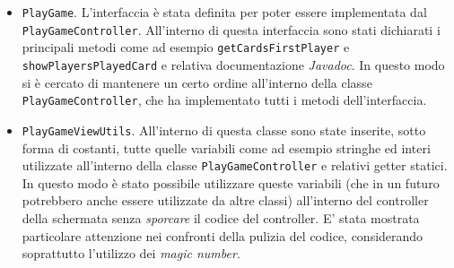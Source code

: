 	\begin{itemize}
	\item \texttt{PlayGame}.
	L'interfaccia è stata definita per poter essere implementata dal \\ \texttt{PlayGameController}. All'interno di questa interfaccia sono stati dichiarati i principali metodi come ad esempio \texttt{getCardsFirstPlayer} e \texttt{showPlayersPlayedCard} e relativa documentazione \textit{Javadoc}. In questo modo si è cercato di mantenere un certo ordine all'interno della classe \texttt{PlayGameController}, che ha implementato tutti i metodi dell'interfaccia.
	
	\item \texttt{PlayGameViewUtils}.
	All'interno di questa classe sono state inserite, sotto forma di costanti, tutte quelle variabili come ad esempio stringhe ed interi utilizzate all'interno della classe \texttt{PlayGameController} e relativi getter statici. In questo modo è stato possibile utilizzare queste variabili (che in un futuro potrebbero anche essere utilizzate da altre classi) all'interno del controller della schermata senza \textit{sporcare} il codice del controller. E' stata mostrata particolare attenzione nei confronti della pulizia del codice, considerando soprattutto l'utilizzo dei \textit{magic number}.
	

\end{itemize}
